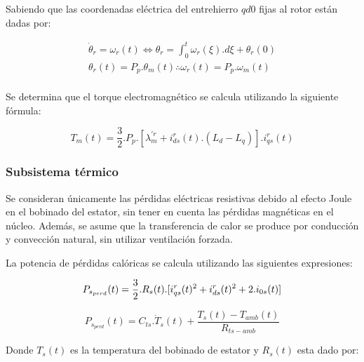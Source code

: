 \documentclass{article}
\begin{document}
    Sabiendo que las coordenadas eléctrica del entrehierro $qd0$ fijas al rotor están dadas por:

    \begin{equation}\label{eq.coordenadas_fijas_al_rotor}
        \begin{aligned}
            \dot{\theta}_r = \omega_r(t) \Leftrightarrow  \theta_r = \int_0^t \omega_r(\xi).d\xi + \theta_r(0)\\
            \theta_r(t) = P_p.\theta_m(t) \therefore \omega_r(t) = P_p.\omega_m(t)\\
        \end{aligned}
    \end{equation}

    Se determina que el torque electromagnético se calcula utilizando la siguiente fórmula:

    \begin{equation}\label{eq.torque_electromagnetico}
        T_{m}(t) = \frac{3}{2}.P_{p}.[\lambda_{m}^{\prime r}+i_{ds}^r(t).(L_{d}-L_{q})].i_{qs}^r(t)
    \end{equation}
        
    \subsubsection{Subsistema térmico} 
    
    Se consideran únicamente las pérdidas eléctricas resistivas debido al efecto Joule en el bobinado del 
    estator, sin tener en cuenta las pérdidas magnéticas en el núcleo. Además, se asume que la 
    transferencia de calor se produce por conducción y convección natural, sin utilizar ventilación forzada.

    La potencia de pérdidas calóricas se calcula utilizando las siguientes expresiones:

    \begin{equation}\label{termico1}
        P_{s_{perd}}(t) =  \frac{3}{2}.R_{s}(t).[i_{qs}^r(t)^2+i_{ds}^r(t)^2+2.i_{0s}(t)]\\
    \end{equation}
    
    \begin{equation}\label{termico2}
        P_{s_{perd}}(t) = C_{ts}.\dot{T}_{s}(t) + \frac{T_{s}(t)-T_{amb}(t)}{R_{ts-amb}}
    \end{equation}
    
    Donde $T_s(t)$ es la temperatura del bobinado de estator y $R_s(t)$ esta dado por:
\end{document}
